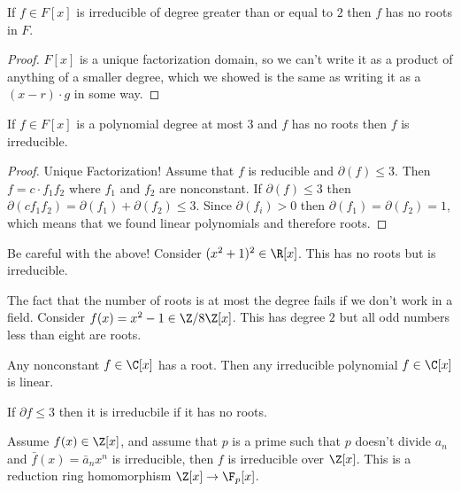 \begin{proposition}
If $f \in F[x]$ is irreducible of degree greater than or equal to $2$ then $f$ has no roots in $F$.
\end{proposition}

\begin{proof}
$F[x]$ is a unique factorization domain, so we can't write it as a product of anything of a smaller degree, which we showed is the same as writing it as a $(x-r) \cdot g$ in some way.
\end{proof}

\begin{proposition}
If $f \in F[x]$ is a polynomial degree at most $3$ and $f$ has no roots then $f$ is irreducible.
\end{proposition}

\begin{proof}
Unique Factorization! Assume that $f$ is reducible and $\partial(f) \leq 3$. Then $f = c \cdot f_1 f_2$ where $f_1$ and $f_2$ are nonconstant. If $\partial(f) \leq 3$ then $\partial(cf_1f_2) = \partial(f_1) + \partial(f_2) \leq 3$. Since $\partial(f_i) > 0$ then $\partial(f_1) = \partial(f_2) = 1$, which means that we found linear polynomials and therefore roots. 
\end{proof}

\begin{example}[Warning]
Be careful with the above! Consider $(x^2+1)^2 \in \R[x]$. This has no roots but is irreducible.
\end{example}

\begin{example}[Warning]
The fact that the number of roots is at most the degree fails if we don't work in a field. Consider $f(x) = x^2 - 1 \in \Z/8\Z[x]$. This has degree $2$ but all odd numbers less than eight are roots.
\end{example}

\begin{theorem}
Any nonconstant $f \in \C[x]$ has a root. Then any irreducible polynomial $f \in \C[x]$ is linear.
\end{theorem}

\begin{problem}
\begin{parts}
\item If $\partial f \leq 3$ then it is irreducbile if it has no roots.
\item 
\begin{theorem}
Assume $f(x) \in \Z[x]$, and assume that $p$ is a prime such that $p$ doesn't divide $a_n$ and $\bar{f}(x) = \bar{a}_nx^n$ is irreducible, then $f$ is irreducible over $\Z[x]$. This is a reduction ring homomorphism $\Z[x] \to \F_p[x]$.
\end{theorem}
\end{parts}
\end{problem}